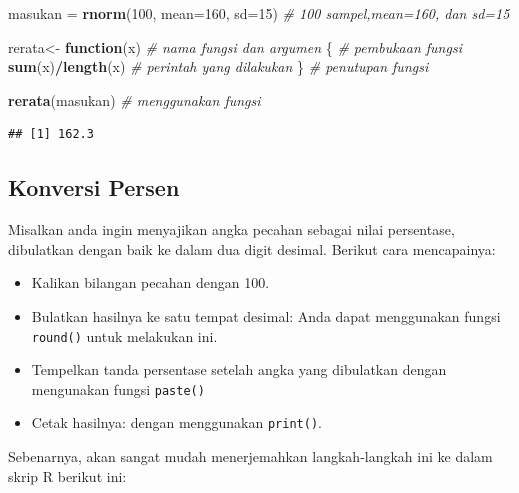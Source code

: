 \documentclass[
]{book}
\newenvironment{Shaded}{\begin{snugshade}}{\end{snugshade}}
\newcommand{\AttributeTok}[1]{\textcolor[rgb]{0.13,0.29,0.53}{#1}}
\newcommand{\CommentTok}[1]{\textcolor[rgb]{0.56,0.35,0.01}{\textit{#1}}}
\newcommand{\ControlFlowTok}[1]{\textcolor[rgb]{0.13,0.29,0.53}{\textbf{#1}}}
\newcommand{\DecValTok}[1]{\textcolor[rgb]{0.00,0.00,0.81}{#1}}
\newcommand{\FunctionTok}[1]{\textcolor[rgb]{0.13,0.29,0.53}{\textbf{#1}}}
\newcommand{\NormalTok}[1]{#1}
\newcommand{\OtherTok}[1]{\textcolor[rgb]{0.56,0.35,0.01}{#1}}
\newcommand{\SpecialCharTok}[1]{\textcolor[rgb]{0.81,0.36,0.00}{\textbf{#1}}}
\providecommand{\tightlist}{%
  \setlength{\itemsep}{0pt}\setlength{\parskip}{0pt}}
\begin{document}
\begin{Shaded}
\begin{Highlighting}[]
\NormalTok{masukan }\OtherTok{=} \FunctionTok{rnorm}\NormalTok{(}\DecValTok{100}\NormalTok{, }\AttributeTok{mean=}\DecValTok{160}\NormalTok{, }\AttributeTok{sd=}\DecValTok{15}\NormalTok{)        }\CommentTok{\# 100 sampel,mean=160, dan sd=15 }

\NormalTok{rerata}\OtherTok{\textless{}{-}} \ControlFlowTok{function}\NormalTok{(x)                         }\CommentTok{\# nama fungsi dan argumen   }
\NormalTok{\{                                            }\CommentTok{\# pembukaan fungsi}
  \FunctionTok{sum}\NormalTok{(x)}\SpecialCharTok{/}\FunctionTok{length}\NormalTok{(x)                           }\CommentTok{\# perintah yang dilakukan }
\NormalTok{\}                                            }\CommentTok{\# penutupan fungsi}

\FunctionTok{rerata}\NormalTok{(masukan)                              }\CommentTok{\# menggunakan fungsi}
\end{Highlighting}
\end{Shaded}

\begin{verbatim}
## [1] 162.3
\end{verbatim}

\hypertarget{konversi-persen}{%
\subsection{Konversi Persen}\label{konversi-persen}}

Misalkan anda ingin menyajikan angka pecahan sebagai nilai persentase, dibulatkan dengan baik ke dalam dua digit desimal. Berikut cara mencapainya:

\begin{itemize}
\tightlist
\item
  Kalikan bilangan pecahan dengan 100.
\item
  Bulatkan hasilnya ke satu tempat desimal: Anda dapat menggunakan fungsi \texttt{round()} untuk melakukan ini.
\item
  Tempelkan tanda persentase setelah angka yang dibulatkan dengan mengunakan fungsi \texttt{paste()}
\item
  Cetak hasilnya: dengan menggunakan \texttt{print()}.
\end{itemize}

Sebenarnya, akan sangat mudah menerjemahkan langkah-langkah ini ke dalam skrip R berikut ini:
\end{document}
